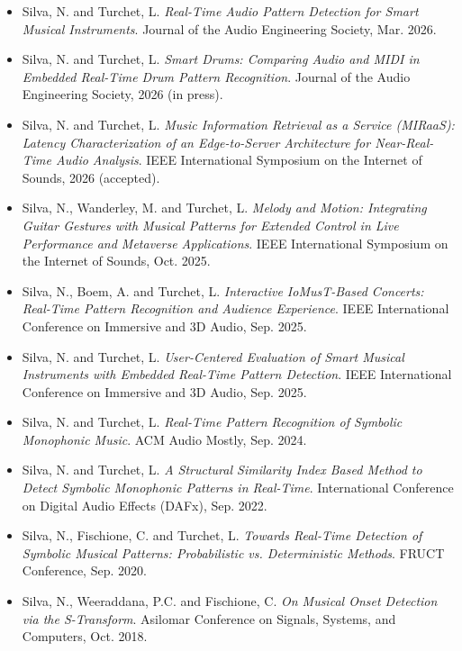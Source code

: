 \documentclass[11pt]{article}
\begin{document}
\begin{itemize}[leftmargin=1.2em, itemsep=-0.25em]
    \item Silva, N. and Turchet, L. \textit{Real-Time Audio Pattern Detection for Smart Musical Instruments}. Journal of the Audio Engineering Society, Mar. 2026.
    \item Silva, N. and Turchet, L. \textit{Smart Drums: Comparing Audio and MIDI in Embedded Real-Time Drum Pattern Recognition}. Journal of the Audio Engineering Society, 2026 (in press).
    \item Silva, N. and Turchet, L. \textit{Music Information Retrieval as a Service (MIRaaS): Latency Characterization of an Edge-to-Server Architecture for Near-Real-Time Audio Analysis}. IEEE International Symposium on the Internet of Sounds, 2026 (accepted).
    \item Silva, N., Wanderley, M. and Turchet, L. \textit{Melody and Motion: Integrating Guitar Gestures with Musical Patterns for Extended Control in Live Performance and Metaverse Applications}. IEEE International Symposium on the Internet of Sounds, Oct. 2025.
    \item Silva, N., Boem, A. and Turchet, L. \textit{Interactive IoMusT-Based Concerts: Real-Time Pattern Recognition and Audience Experience}. IEEE International Conference on Immersive and 3D Audio, Sep. 2025.
    \item Silva, N. and Turchet, L. \textit{User-Centered Evaluation of Smart Musical Instruments with Embedded Real-Time Pattern Detection}. IEEE International Conference on Immersive and 3D Audio, Sep. 2025.
    \item Silva, N. and Turchet, L. \textit{Real-Time Pattern Recognition of Symbolic Monophonic Music}. ACM Audio Mostly, Sep. 2024.
    \item Silva, N. and Turchet, L. \textit{A Structural Similarity Index Based Method to Detect Symbolic Monophonic Patterns in Real-Time}. International Conference on Digital Audio Effects (DAFx), Sep. 2022.
    \item Silva, N., Fischione, C. and Turchet, L. \textit{Towards Real-Time Detection of Symbolic Musical Patterns: Probabilistic vs. Deterministic Methods}. FRUCT Conference, Sep. 2020.
    \item Silva, N., Weeraddana, P.C. and Fischione, C. \textit{On Musical Onset Detection via the S-Transform}. Asilomar Conference on Signals, Systems, and Computers, Oct. 2018.
\end{itemize}
\end{document}
